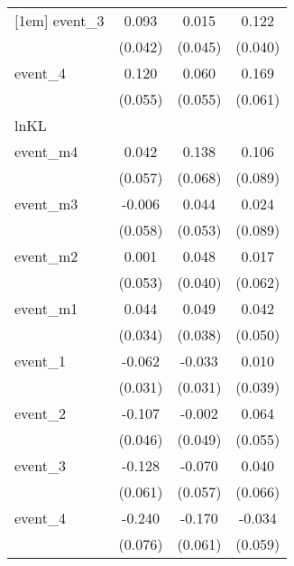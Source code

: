 {\begin{tabular}{l*{3}{c}}
[1em]
event\_3     &       0.093\sym{*}  &       0.015         &       0.122\sym{**} \\
            &     (0.042)         &     (0.045)         &     (0.040)         \\
[1em]
event\_4     &       0.120\sym{*}  &       0.060         &       0.169\sym{**} \\
            &     (0.055)         &     (0.055)         &     (0.061)         \\
\hline
lnKL        &                     &                     &                     \\
event\_m4    &       0.042         &       0.138\sym{*}  &       0.106         \\
            &     (0.057)         &     (0.068)         &     (0.089)         \\
[1em]
event\_m3    &      -0.006         &       0.044         &       0.024         \\
            &     (0.058)         &     (0.053)         &     (0.089)         \\
[1em]
event\_m2    &       0.001         &       0.048         &       0.017         \\
            &     (0.053)         &     (0.040)         &     (0.062)         \\
[1em]
event\_m1    &       0.044         &       0.049         &       0.042         \\
            &     (0.034)         &     (0.038)         &     (0.050)         \\
[1em]
event\_1     &      -0.062\sym{*}  &      -0.033         &       0.010         \\
            &     (0.031)         &     (0.031)         &     (0.039)         \\
[1em]
event\_2     &      -0.107\sym{*}  &      -0.002         &       0.064         \\
            &     (0.046)         &     (0.049)         &     (0.055)         \\
[1em]
event\_3     &      -0.128\sym{*}  &      -0.070         &       0.040         \\
            &     (0.061)         &     (0.057)         &     (0.066)         \\
[1em]
event\_4     &      -0.240\sym{**} &      -0.170\sym{**} &      -0.034         \\
            &     (0.076)         &     (0.061)         &     (0.059)         \\

\end{tabular}}
